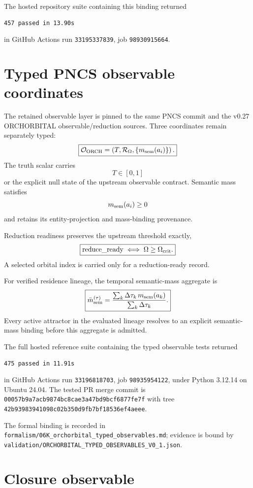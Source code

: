 The hosted repository suite containing this binding returned
\begin{verbatim}
457 passed in 13.90s
\end{verbatim}
in GitHub Actions run \texttt{33195337839}, job \texttt{98930915664}.

\section{Typed PNCS observable coordinates}

The retained observable layer is pinned to the same PNCS commit and the v0.27 ORCHORBITAL observable/reduction sources. Three coordinates remain separately typed:
\[
\boxed{
\mathcal O_{\rm ORCH}
=
\left(
T,
\mathcal R_{\Omega},
\{m_{\rm sem}(a_i)\}
\right).
}
\]
The truth scalar carries
\[
T\in[0,1]
\]
or the explicit null state of the upstream observable contract. Semantic mass satisfies
\[
m_{\rm sem}(a_i)\ge0
\]
and retains its entity-projection and mass-binding provenance.

Reduction readiness preserves the upstream threshold exactly,
\[
\boxed{
\mathrm{reduce\_ready}\iff\Omega\ge\Omega_{\rm crit}.
}
\]
A selected orbital index is carried only for a reduction-ready record.

For verified residence lineage, the temporal semantic-mass aggregate is
\[
\boxed{
\bar m_{\rm sem}^{(\tau)}
=
\frac{\sum_k\Delta\tau_k\,m_{\rm sem}(a_k)}{\sum_k\Delta\tau_k}.
}
\]
Every active attractor in the evaluated lineage resolves to an explicit semantic-mass binding before this aggregate is admitted.

The full hosted reference suite containing the typed observable tests returned
\begin{verbatim}
475 passed in 11.91s
\end{verbatim}
in GitHub Actions run \texttt{33196818703}, job \texttt{98935954122}, under Python 3.12.14 on Ubuntu 24.04. The tested PR merge commit is
\texttt{00057b9a7acb9874bc8cae3a47bd9bcf6877fe7f}
with tree
\texttt{42b93983941098c02b350d9fb7bf18536ef4aeee}.

The formal binding is recorded in \texttt{formalism/06K\_orchorbital\_typed\_observables.md}; evidence is bound by \texttt{validation/ORCHORBITAL\_TYPED\_OBSERVABLES\_V0\_1.json}.

\section{Closure observable}

